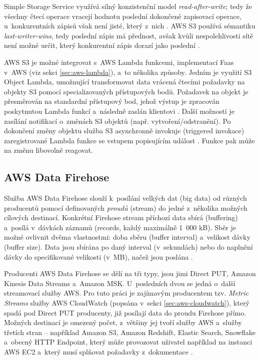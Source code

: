 \documentclass[czech, ing, kiv, he, iso690]{fasthesis}
\begin{document}
Simple Storage Service využívá silný konzistenční model \emph{read-after-write}; tedy že všechny čtecí operace vracejí hodnotu poslední dokončené zapisovací operace, u~konkurentních zápisů však není jisté, který z~nich . AWS S3 používá sémantiku \emph{last-writer-wins}, tedy poslední zápis má přednost, avšak kvůli nespolehlivosti sítě není možné určit, který konkurentní zápis dorazí jako poslední \cite{s3.docs.aws}.

AWS S3 je možné integrovat s~AWS Lambda funkcemi, implementací Faas v~AWS (viz sekci \ref{sec:aws-lambda}), a~to několika způsoby. Jedním je využití S3 Object Lambda, umožnující transformovat data vrácená čtecími požadavky na objekty S3 pomocí specializovaných přístupových bodů. Požadavek na objekt je přesměrován na standardní přístupový bod, jehož výstup je zpracován poskytnutou Lambda funkcí a~následně zaslán klientovi \cite{s3.docs.aws}. Další možností je zasílání notifikací o~změnách S3 objektů (např. vytvoření/odstranění). Po dokončení změny objektu služba S3 asynchronně invokuje (triggered invokace) zaregistrované Lambda funkce se vstupem popisujícím událost \cite{lambda.docs.aws}. Funkce pak může na změnu libovolně reagovat.

\subsection{AWS Data Firehose}
Služba AWS Data Firehose slouží k~posílání velkých dat (big data) od různých producentů pomocí definovaných \emph{proudů} (stream) do jedné z~několika možných cílových destinací. Konkrétní Firehose stream příchozí data sbírá (buffering) a~posílá v~dávkách záznamů (records, každý maximálně 1~000 kB). Sběr je možné ovlivnit dvěma vlastnostmi: doba sběru (buffer interval) a~velikost dávky (buffer size). Data jsou sbírána po daný interval (v~sekundách) nebo do naplnění dávky do specifikované velikosti (v~MB), načež jsou poslána \cite{firehose.docs.aws}.

Producenti AWS Data Firehose se dělí na tři typy, jsou jimi Direct PUT, Amazon Kinesis Data Streams a~Amazon MSK. U~posledních dvou se jedná o~další streamovací služby AWS. Pro tuto práci je zajímavým producentem tzv. \emph{Metric Streams} služby AWS CloudWatch (popsána v~sekci \ref{sec:aws-cloudwatch}), který spadá pod Direct PUT producenty, již posílají data do proudu Firehose přímo. Možných destinací je omezený počet, z~většiny jej tvoří služby AWS a~služby třetích stran -- například Amazon S3, Amazon Redshift, Elastic Search, Snowflake a~obecný HTTP Endpoint, který může provozovat uživatel například na instanci AWS EC2 a~který musí splňovat požadavky z~dokumentace \cite{firehose.docs.aws}.
\end{document}
